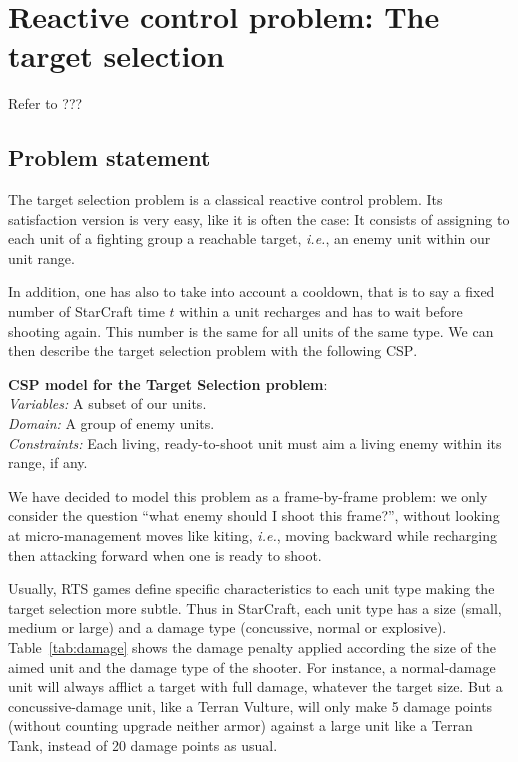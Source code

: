 \documentclass[journal]{IEEEtran}
\newcommand{\csp}{\textsc{CSP}\xspace}
\newcommand{\ghost}{\textsc{GHOST}\xspace}
\newcommand{\ie}{\textit{i.e.}}
\newcommand{\modelcsp}[4]%
{ \begin{trivlist}
  \item[]%
    \textbf{CSP model for #1}:\\
    \textit{Variables:} #2\\
    \textit{Domain:} #3\\
    \textit{Constraints:} #4
  \end{trivlist}%
}
\begin{document}


\section{Reactive control problem: The target selection}\label{sec:target}

Refer to ???
\subsection{Problem statement}

The  target   selection  problem  is  a   classical  reactive  control
problem. Its satisfaction  version is very easy, like it  is often the
case: It  consists of  assigning to  each unit of  a fighting  group a
reachable target, \ie, an enemy unit within our unit range.

In addition, one has also to take  into account a cooldown, that is to
say a fixed  number of StarCraft time $t$ within  a unit recharges and
has to  wait before shooting  again. This number  is the same  for all
units of  the same  type. We  can then  describe the  target selection
problem with the following \csp.

\modelcsp{the Target Selection problem}%
{A subset of our units.}%
{A group of enemy units.}%
{Each living, ready-to-shoot  unit must aim a living  enemy within its
  range, if any.}

We have decided to model this  problem as a frame-by-frame problem: we
only consider the question ``what  enemy should I shoot this frame?'',
without  looking at  micro-management moves  like kiting,  \ie, moving
backward while recharging then attacking  forward when one is ready to
shoot.

Usually, RTS games  define specific characteristics to  each unit type
making the target selection more  subtle. Thus in StarCraft, each unit
type  has  a  size  (small,  medium   or  large)  and  a  damage  type
(concussive, normal  or explosive).  Table~\ref{tab:damage}  shows the
damage penalty  applied according the size  of the aimed unit  and the
damage type of  the shooter.  For instance, a  normal-damage unit will
always  afflict  a  target  with  full  damage,  whatever  the  target
size. But a  concussive-damage unit, like a Terran  Vulture, will only
make 5 damage points (without  counting upgrade neither armor) against
a large unit like a Terran Tank, instead of 20 damage points as usual.
\end{document}
